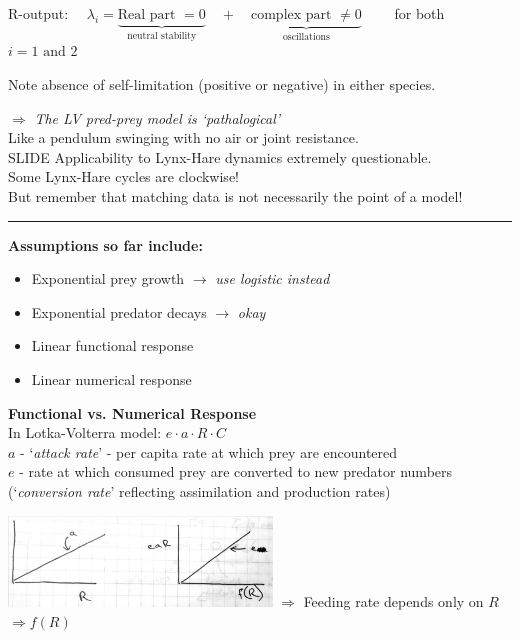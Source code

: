 \documentclass{article}
\newcommand{\note}[1]{\colorbox{gray!30}{#1}}
\newcommand{\ind}{\-\hspace{1cm}}
\begin{document}
\ind R-output: $\quad \lambda_i = \underbrace{\text{Real part }= 0}_{\text{neutral stability}} \quad + \quad \underbrace{\text{complex part }\neq 0}_{\text{oscillations}} \quad \quad $ for both $i=1 \text{ and } 2$

\vspace{0.3cm}

Note absence of self-limitation (positive or negative) in either species.

$\Rightarrow$ \emph{The LV pred-prey model is `pathalogical'}\\
\ind Like a pendulum swinging with no air or joint resistance.\\
\ind \note{SLIDE } 
Applicability to Lynx-Hare dynamics extremely questionable.\\
\ind \ind \ind Some Lynx-Hare cycles are clockwise!\\
\ind But remember that matching data is not necessarily the point of a model!

\rule[0.5ex]{\linewidth}{1pt}

\textbf{Assumptions so far include:}
\begin{itemize}
\setlength\itemsep{0em}
	\item Exponential prey growth $\rightarrow$ \emph{use logistic instead}
	\item Exponential predator decays $\rightarrow$ \emph{okay}
	\item Linear functional response
	\item Linear numerical response
\end{itemize}

\textbf{Functional vs. Numerical Response}\\
In Lotka-Volterra model: \ind $e \cdot a \cdot R \cdot C$\\
\ind $a$ - `\emph{attack rate}' - per capita rate at which prey are encountered\\ 
\ind $e$ - rate at which consumed prey are converted to new predator numbers \\
\ind \ind (`\emph{conversion rate}' reflecting assimilation and production rates)

\includegraphics[width=7cm]{figs/FR_T1.pdf}
$\Rightarrow$ Feeding rate depends only on $R$ $\Rightarrow f(R)$\\
\end{document}
